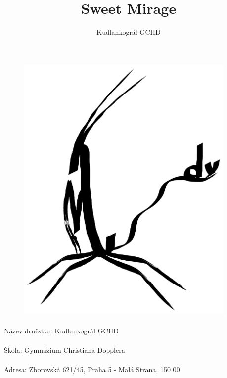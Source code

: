 \documentclass[10pt,a4paper]{article}
\title{Sweet Mirage}
\author{Kudlankográl GCHD}
\date{}
\makeatletter
\newcommand{\settitle}{\@maketitle}
\makeatother
\begin{document}
\settitle
\thispagestyle{empty}
\addtocounter{page}{-1}


\begin{figure}[H]
\centering
    \includegraphics[width=0.95\textwidth]{kudlankogral.png}
\end{figure}

\paragraph{}
Název družstva: Kudlankográl GCHD
\paragraph{}
Škola: Gymnázium Christiana Dopplera
\paragraph{}
Adresa: Zborovská 621/45, Praha 5 - Malá Strana, 150 00

\clearpage
\newpage


\author{}
\maketitle
\tableofcontents
\end{document}
